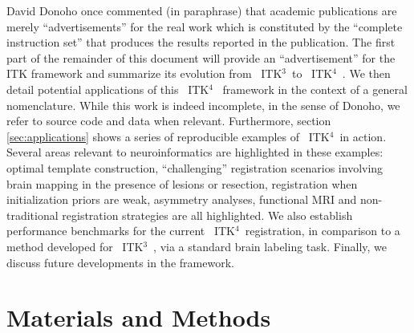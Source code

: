 \documentclass{frontiersSCNS}
\newcommand{\tk}{~ITK$^{\text{4}}$~}
\newcommand{\tkt}{~ITK$^{\text{3}}$~}
\begin{document}



David Donoho once commented (in paraphrase) that academic publications
are merely ``advertisements'' for the real work which is constituted
by the ``complete instruction set'' that produces the results reported
in the publication.  The first part of the remainder of this document will provide an
``advertisement'' for the ITK framework and summarize its evolution
from \tkt to \tk.  We then detail potential applications of this \tk
framework in the context of a general nomenclature.  While this work is indeed incomplete, in the
sense of Donoho, we refer to source code and data when relevant.
Furthermore, section \ref{sec:applications} shows a series of
reproducible examples of \tk in action.  Several
areas relevant to neuroinformatics are highlighted in these examples: optimal template
construction, ``challenging'' registration scenarios involving brain
mapping in the presence of lesions or resection, registration when
initialization priors are weak, asymmetry analyses, functional MRI and
non-traditional registration strategies are all highlighted.  We also
establish performance benchmarks for the current \tk registration, in
comparison to a method developed for \tkt, via
a standard brain labeling task.  Finally, we discuss future developments
in the framework.

\section{Materials and Methods}
\end{document}
